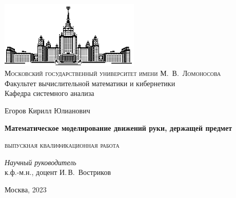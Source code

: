 \thispagestyle{empty}
\begin{center}
    \ \vspace{-3cm}

    \includegraphics[width=0.5\textwidth]{title_page/msu.eps}\\

    {\small{\scshape  Московский государственный университет имени М.~В.~Ломоносова}\\
    Факультет вычислительной математики и кибернетики\\
    Кафедра системного анализа}

    \vfill

    {\Large Егоров Кирилл Юлианович}

    \vspace{1cm}

    {\LARGE\bfseries Математическое моделирование движений руки,
    держащей предмет}

    \vspace{1.5cm}

    {\scshape выпускная квалификационная работа}
\end{center}

\vspace{3cm}

\begin{flushright}
    \large
    \textit{Научный руководитель}\\
    к.ф.-м.н., доцент И.\,В.~Востриков
\end{flushright}

\vfill

\begin{center}
    Москва, 2023
\end{center}

\clearpage